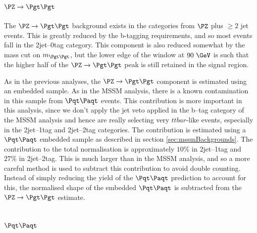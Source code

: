 \subsection{$\ZToTauTau$}

The $\ZToTauTau$ background exists in the categories from $\PZ$ plus $\geq 2$
jet events. This is greatly reduced by the b-tagging requirements, and so most
events fall in the 2jet--0tag category. This component is also reduced somewhat
by the mass cut on $m_{\Pgt\Pgt}$, but the lower edge of the window at $90~\GeV$
is such that the higher half of the $\ZToTauTau$ peak is still retained in the
signal region.  

As in the previous analyses, the $\ZToTauTau$ component is estimated using an
embedded sample. As in the \ac{MSSM} analysis, there is a known contamination in
this sample from $\ttbar$ events. This contribution is more important in this
analysis, since we don't apply the jet veto applied in the b--tag category of
the \ac{MSSM} analysis and hence are really selecting very $ttbar$-like events,
especially in the 2jet--1tag and 2jet--2tag categories. The contribution is
estimated using a $\ttbar$ embedded sample as described in section
\ref{sec:mssmBackgrounds}. The contribution to the total normalisation is
approximately $10\%$ in 2jet--1tag and $27\%$ in 2jet--2tag. This is much larger
than in the \ac{MSSM} analysis, and so a more careful method is used to subtract
this contribution to avoid double counting. Instead of simply reducing the yield
of the $\ttbar$ prediction to account for this, the normalised shape of the
embedded $\ttbar$ is subtracted from the $\ZToTauTau$ estimate.

\subsection{$\ttbar$}

